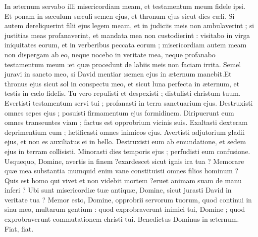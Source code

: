 {\VERSE In æternum servabo illi misericordiam meam, et testamentum meum fidele ipsi. \EVERSE
\VERSE Et ponam in sæculum sæculi semen ejus, et thronum ejus sicut dies cæli. \EVERSE
\VERSE Si autem dereliquerint filii ejus legem meam, et in judiciis meis non ambulaverint ;  \EVERSE
\VERSE si justitias meas profanaverint, et mandata mea non custodierint : \EVERSE
\VERSE visitabo in virga iniquitates eorum, et in verberibus peccata eorum ;  \EVERSE
\VERSE misericordiam autem meam non dispergam ab eo, neque nocebo in veritate mea,  \EVERSE
\VERSE neque profanabo testamentum meum :et quæ procedunt de labiis meis non faciam irrita. \EVERSE
\VERSE Semel juravi in sancto meo,  si David mentiar :\VERSE semen ejus in æternum manebit.Et thronus ejus sicut sol in conspectu meo,  \EVERSE
\VERSE et sicut luna perfecta in æternum, et testis in cælo fidelis. \EVERSE
\VERSE Tu vero repulisti et despexisti ; distulisti christum tuum. \EVERSE
\VERSE Evertisti testamentum servi tui ; profanasti in terra sanctuarium ejus. \EVERSE
\VERSE Destruxisti omnes sepes ejus ; posuisti firmamentum ejus formidinem. \EVERSE
\VERSE Diripuerunt eum omnes transeuntes viam ; factus est opprobrium vicinis suis. \EVERSE
\VERSE Exaltasti dexteram deprimentium eum ; lætificasti omnes inimicos ejus. \EVERSE
\VERSE Avertisti adjutorium gladii ejus, et non es auxiliatus ei in bello. \EVERSE
\VERSE Destruxisti eum ab emundatione, et sedem ejus in terram collisisti. \EVERSE
\VERSE Minorasti dies temporis ejus ; perfudisti eum confusione. \EVERSE
\VERSE Usquequo,  Domine,  avertis in finem ?exardescet sicut ignis ira tua ? \EVERSE
\VERSE Memorare quæ mea substantia :numquid enim vane constituisti omnes filios hominum ? \EVERSE
\VERSE Quis est homo qui vivet et non videbit mortem ?eruet animam suam de manu inferi ? \EVERSE
\VERSE Ubi sunt misericordiæ tuæ antiquæ,  Domine, sicut jurasti David in veritate tua ? \EVERSE
\VERSE Memor esto,  Domine,  opprobrii servorum tuorum, quod continui in sinu meo,  multarum gentium : \EVERSE
\VERSE quod exprobraverunt inimici tui,  Domine ; quod exprobraverunt commutationem christi tui. \EVERSE
\VERSE Benedictus Dominus in æternum. Fiat,  fiat.}
